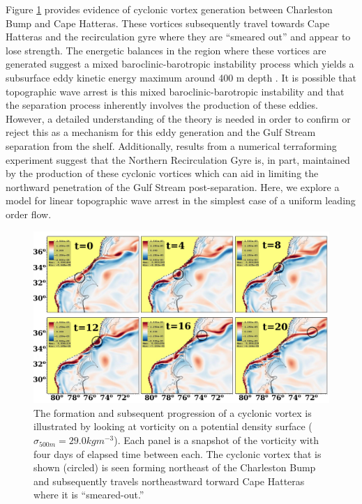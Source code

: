 \documentclass[12pt]{workjournal}
\begin{document}
 Figure \ref{fig:vortices} provides evidence of cyclonic vortex generation between Charleston Bump and Cape Hatteras. These vortices subsequently travel towards Cape Hatteras and the recirculation gyre where they are ``smeared out'' and appear to lose strength. The energetic balances in the region where these vortices are generated  suggest a mixed baroclinic-barotropic instability process which yields a subsurface eddy kinetic energy maximum around 400 m depth \citep{Gula2015}. It is possible that topographic wave arrest is this mixed baroclinic-barotropic instability and that the separation process inherently involves the production of these eddies. However, a detailed understanding of the theory is needed in order to confirm or reject this as a mechanism for this eddy generation and the Gulf Stream separation from the shelf. Additionally, results from a numerical terraforming experiment suggest that the Northern Recirculation Gyre is, in part, maintained by the production of these cyclonic vortices which can aid in limiting the northward penetration of the Gulf Stream post-separation. Here, we explore a model for linear topographic wave arrest in the simplest case of a uniform leading order flow. 

\begin{figure}
\begin{center}
\includegraphics[scale=0.25]{figs/topographicwaves/vortices.png}
\caption{ The formation and subsequent progression of a cyclonic vortex is illustrated by looking at vorticity on a potential density surface ($\sigma_{500m} = 29.0 kg m^{-3}$). Each panel is a snapshot of the vorticity with four days of elapsed time between each. The cyclonic vortex that is shown (circled) is seen forming northeast of the Charleston Bump and subsequently travels northeastward torward Cape Hatteras where it is ``smeared-out.''}\label{fig:vortices}
\end{center}
\end{figure}
\end{document}

